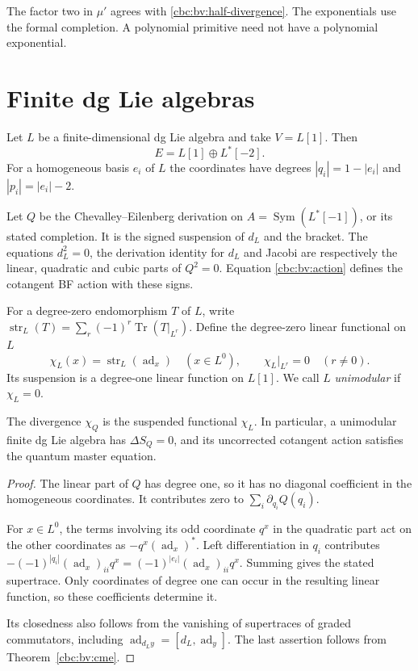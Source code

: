 The factor two in $\mu'$ agrees with
\eqref{cbc:bv:half-divergence}.  The exponentials use the formal
completion.  A polynomial primitive need not have a polynomial
exponential.

\section{Finite dg Lie algebras}
Let $L$ be a finite-dimensional dg Lie algebra and take $V=L[1]$.
Then
\[
 E=L[1]\oplus L^*[-2].
\]
For a homogeneous basis $e_i$ of $L$ the coordinates have degrees
$|q_i|=1-|e_i|$ and $|p_i|=|e_i|-2$.

Let $Q$ be the Chevalley--Eilenberg derivation on
$A=\operatorname{Sym}(L^*[-1])$, or its stated completion.
It is the signed suspension of $d_L$ and the bracket.
The equations $d_L^2=0$, the derivation identity for $d_L$ and Jacobi
are respectively the linear, quadratic and cubic parts of $Q^2=0$.
Equation \eqref{cbc:bv:action} defines the cotangent BF action with
these signs.

For a degree-zero endomorphism $T$ of $L$, write
$\operatorname{str}_L(T)=\sum_r(-1)^r\operatorname{Tr}(T|_{L^r})$.
Define the degree-zero linear functional on $L$
\[
 \chi_L(x)=\operatorname{str}_L(\operatorname{ad}_x)
       \quad(x\in L^0),\qquad \chi_L|_{L^r}=0\quad(r\ne0).
\]
Its suspension is a degree-one linear function on $L[1]$.
We call $L$ \emph{unimodular} if $\chi_L=0$.

\begin{proposition}\label{cbc:bv:modular}
The divergence $\chi_Q$ is the suspended functional $\chi_L$.
In particular, a unimodular finite dg Lie algebra has
$\Delta S_Q=0$, and its uncorrected cotangent action satisfies the
quantum master equation.
\end{proposition}
\begin{proof}
The linear part of $Q$ has degree one, so it has no diagonal
coefficient in the homogeneous coordinates.  It contributes zero
to $\sum_i\partial_{q_i}Q(q_i)$.

For $x\in L^0$, the terms involving its odd coordinate $q^x$
in the quadratic part act on the other coordinates as
$-q^x(\operatorname{ad}_x)^*$.
Left differentiation in $q_i$ contributes
$-(-1)^{|q_i|}(\operatorname{ad}_x)_{ii}q^x
=(-1)^{|e_i|}(\operatorname{ad}_x)_{ii}q^x$.
Summing gives the stated supertrace.
Only coordinates of degree one can occur in the resulting linear
function, so these coefficients determine it.

Its closedness also follows from the vanishing of supertraces of
graded commutators, including
$\operatorname{ad}_{d_Ly}=[d_L,\operatorname{ad}_y]$.
The last assertion follows from Theorem~\ref{cbc:bv:cme}.
\end{proof}

